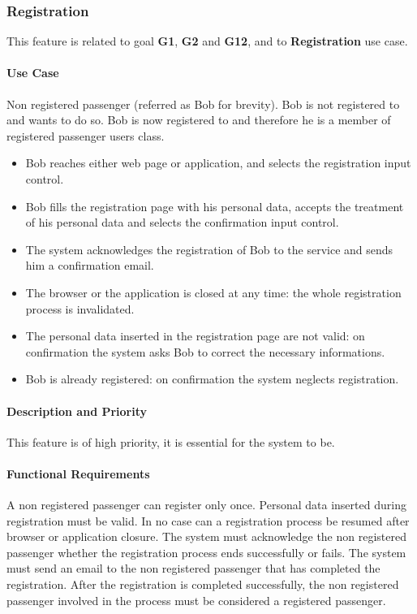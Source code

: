 \subsubsection{Registration}
This feature is related to goal \textbf{G1}, \textbf{G2} and \textbf{G12}, and to \textbf{Registration} use case.
\paragraph{Use Case}
\begin{itemize}
	 Non registered passenger (referred as Bob for brevity).
	 Bob is not registered to \myTaxiService{} and wants to do so.
	 Bob is now registered to \myTaxiService{} and therefore he is a member of registered passenger users class.
	\begin{itemize}
		\item Bob reaches either \myTaxiService{} web page or application, and selects the registration input control.
		\item Bob fills the registration page with his personal data, accepts the treatment of his personal data and selects the confirmation input control.
		\item The system acknowledges the registration of Bob to the service and sends him a confirmation email.
	\end{itemize}
	\begin{itemize}
		\item The browser or the application is closed at any time: the whole registration process is invalidated.
		\item The personal data inserted in the registration page are not valid: on confirmation the system asks Bob to correct the necessary informations.
		\item Bob is already registered: on confirmation the system neglects registration.
	\end{itemize}
\end{itemize}
\paragraph{Description and Priority}
This feature is of high priority, it is essential for the system to be.\par
\paragraph{Functional Requirements}
\begin{itemize}
	 A non registered passenger can register only once.
	 Personal data inserted during registration must be valid.
	 In no case can a registration process be resumed after browser or application closure.
	 The system must acknowledge the non registered passenger whether the registration process ends successfully or fails.
	 The system must send an email to the non registered passenger that has completed the registration.
	 After the registration is completed successfully, the non registered passenger involved in the process must be considered a registered passenger.
\end{itemize}
